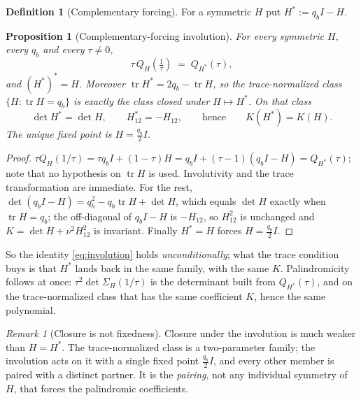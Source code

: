 \documentclass[11pt]{article}
\theoremstyle{plain}
\newtheorem{proposition}[theorem]{Proposition}
\theoremstyle{definition}
\newtheorem{definition}[theorem]{Definition}
\theoremstyle{remark}
\newtheorem{remark}[theorem]{Remark}
\newcommand{\tr}{\operatorname{tr}}
\newcommand{\Sig}{\Sigma}
\begin{document}
\begin{definition}[Complementary forcing]\label{def:complement}
For a symmetric $H$ put $H^{*}:=q_bI-H$.
\end{definition}

\begin{proposition}[Complementary-forcing involution]\label{prop:involution}
For every symmetric $H$, every $q_b$ and every $\tau\neq0$,
\begin{equation}
  \tau\,Q_H\!\left(\tfrac1\tau\right) \;=\; Q_{H^{*}}(\tau), \label{eq:involution}
\end{equation}
and $(H^{*})^{*}=H$. Moreover $\tr H^{*}=2q_b-\tr H$, so the trace-normalized class
$\{H:\tr H=q_b\}$ is exactly the class closed under $H\mapsto H^{*}$. On that class
\begin{equation}
  \det H^{*}=\det H, \qquad H^{*}_{12}=-H_{12}, \qquad\text{hence}\qquad K(H^{*})=K(H).
  \label{eq:Kinvariant}
\end{equation}
The unique fixed point is $H=\tfrac{q_b}{2}I$.
\end{proposition}

\begin{proof}
$\tau Q_H(1/\tau)=\tau q_bI+(1-\tau)H=q_bI+(\tau-1)(q_bI-H)=Q_{H^{*}}(\tau)$; note that no
hypothesis on $\tr H$ is used. Involutivity and the trace transformation are immediate. For the
rest, $\det(q_bI-H)=q_b^2-q_b\tr H+\det H$, which equals $\det H$ exactly when $\tr H=q_b$; the
off-diagonal of $q_bI-H$ is $-H_{12}$, so $H_{12}^2$ is unchanged and
$K=\det H+\nu^2H_{12}^2$ is invariant. Finally $H^{*}=H$ forces $H=\tfrac{q_b}{2}I$.
\end{proof}

So the identity \eqref{eq:involution} holds \emph{unconditionally}; what the trace condition buys
is that $H^{*}$ lands back in the same family, with the same $K$. Palindromicity follows at once:
$\tau^2\det\Sig_H(1/\tau)$ is the determinant built from $Q_{H^{*}}(\tau)$, and on the
trace-normalized class that has the same coefficient $K$, hence the same polynomial.

\begin{remark}[Closure is not fixedness]\label{rem:closurenotfixed}
Closure under the involution is much weaker than $H=H^{*}$. The trace-normalized class is a
two-parameter family; the involution acts on it with a single fixed point $\tfrac{q_b}{2}I$, and
every other member is paired with a distinct partner. It is the \emph{pairing}, not any
individual symmetry of $H$, that forces the palindromic coefficients.
\end{remark}
\end{document}

